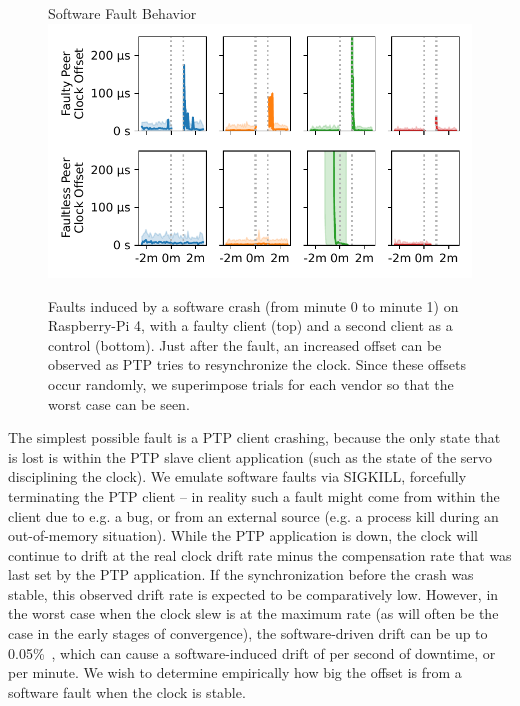 \begin{figure}
    \centering
    {\sffamily\footnotesize\hspace{1.5cm} Software Fault Behavior}
    \includegraphics[width=\linewidth]{res/generated/fault/software/slave_rpi-4_peer_comparison.pdf}
    \legend
    \caption{Faults induced by a software crash (from minute 0 to minute 1) on Raspberry-Pi 4, with a faulty client (top) and a second client as a control (bottom). Just after the fault, an increased offset can be observed as PTP tries to resynchronize the clock. Since these offsets occur randomly, we superimpose \fNum{\bSoftwareFaultNumProfiles} trials for each vendor so that the worst case can be seen.}
    \label{fig:software_fault}
\end{figure}

The simplest possible fault is a PTP client crashing, because the only state that is lost is within the PTP slave client application (such as the state of the servo disciplining the clock). We emulate software faults via SIGKILL, forcefully terminating the PTP client -- in reality such a fault might come from within the client due to e.g. a bug, or from an external source (e.g. a process kill during an out-of-memory situation). While the PTP application is down, the clock will continue to drift at the real clock drift rate minus the compensation rate that was last set by the PTP application. If the synchronization before the crash was stable, this observed drift rate is expected to be comparatively low. However, in the worst case when the clock slew is at the maximum rate (as will often be the case in the early stages of convergence), the software-driven drift can be up to 0.05\%~\cite{adjtimex}, which can cause a software-induced drift of  per second of downtime, or \fTimeMS{\windowOfUncertaintyOneMinute} per minute. We wish to determine empirically how big the offset is from a software fault when the clock is stable.

